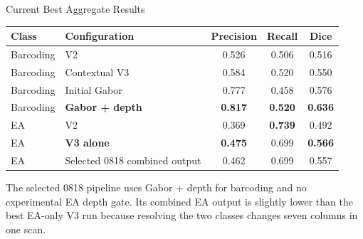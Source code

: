 \documentclass[aspectratio=169]{beamer}
\begin{document}
\begin{frame}{Current Best Aggregate Results}

\begin{table}
\centering
\begin{tabular}{llccc}
\toprule
\textbf{Class} & \textbf{Configuration} & \textbf{Precision} &
\textbf{Recall} & \textbf{Dice} \\
\midrule
Barcoding & V2 & 0.526 & 0.506 & 0.516 \\
Barcoding & Contextual V3 & 0.584 & 0.520 & 0.550 \\
Barcoding & Initial Gabor & 0.777 & 0.458 & 0.576 \\
Barcoding & \textbf{Gabor + depth} & \textbf{0.817} & \textbf{0.520} & \textbf{0.636} \\
\midrule
EA & V2 & 0.369 & \textbf{0.739} & 0.492 \\
EA & \textbf{V3 alone} & \textbf{0.475} & 0.699 & \textbf{0.566} \\
EA & Selected 0818 combined output & 0.462 & 0.699 & 0.557 \\
\bottomrule
\end{tabular}
\end{table}

The selected 0818 pipeline uses Gabor + depth for barcoding and no experimental
EA depth gate. Its combined EA output is slightly lower than the best EA-only
V3 run because resolving the two classes changes seven columns in one scan.

\end{frame}
\end{document}
